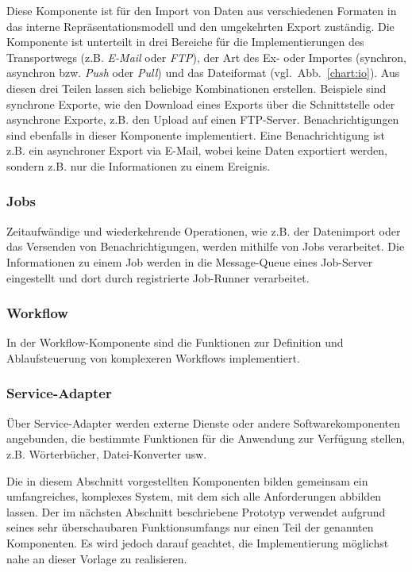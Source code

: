 Diese Komponente ist für den Import von Daten aus verschiedenen Formaten in das interne Repräsentationsmodell und den umgekehrten Export zuständig. Die Komponente ist unterteilt in drei Bereiche für die Implementierungen des Transportwegs (z.B. \emph{E-Mail} oder \emph{FTP}), der Art des Ex- oder Importes (synchron, asynchron bzw. \emph{Push} oder \emph{Pull}) und das Dateiformat (vgl.~Abb.~\ref{chart:io}). Aus diesen drei Teilen lassen sich beliebige Kombinationen erstellen. Beispiele sind synchrone Exporte, wie den Download eines Exports über die Schnittstelle oder asynchrone Exporte, z.B. den Upload auf einen FTP-Server. Benachrichtigungen sind ebenfalls in dieser Komponente implementiert. Eine Benachrichtigung ist z.B. ein asynchroner Export via E-Mail, wobei keine Daten exportiert werden, sondern z.B. nur die Informationen zu einem Ereignis.

\subsubsection{Jobs}

Zeitaufwändige und wiederkehrende Operationen, wie z.B. der Datenimport oder das Versenden von Benachrichtigungen, werden mithilfe von Jobs verarbeitet. Die Informationen zu einem Job werden in die Message-Queue eines Job-Server eingestellt und dort durch registrierte Job-Runner verarbeitet.

\subsubsection{Workflow}

In der Workflow-Komponente sind die Funktionen zur Definition und Ablaufsteuerung von komplexeren Workflows implementiert.

\subsubsection{Service-Adapter}

Über Service-Adapter werden externe Dienste oder andere Softwarekomponenten angebunden, die bestimmte Funktionen für die Anwendung zur Verfügung stellen, z.B. Wörterbücher, Datei-Konverter usw.

\secbar

Die in diesem Abschnitt vorgestellten Komponenten bilden gemeinsam ein umfangreiches, komplexes System, mit dem sich alle Anforderungen abbilden lassen. Der im nächsten Abschnitt beschriebene Prototyp verwendet aufgrund seines sehr überschaubaren Funktionsumfangs nur einen Teil der genannten Komponenten. Es wird jedoch darauf geachtet, die Implementierung möglichst nahe an dieser Vorlage zu realisieren.

